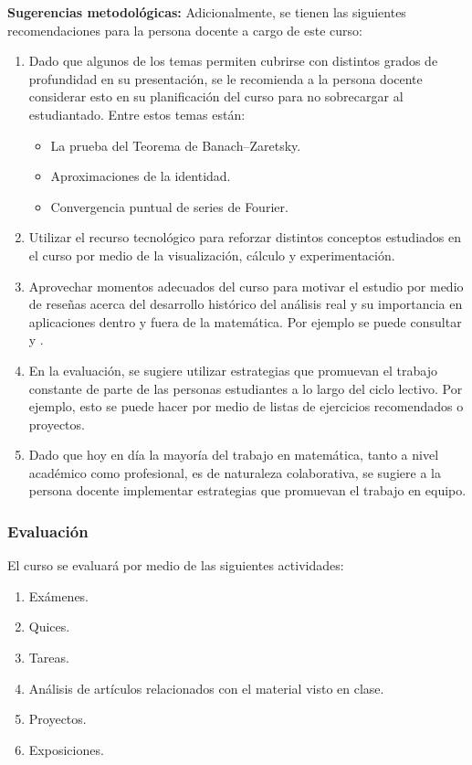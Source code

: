 \begin{refsection}
\textbf{Sugerencias metodológicas:} Adicionalmente, se tienen las siguientes recomendaciones para la persona docente a cargo de este curso:
\begin{enumerate}
    \item Dado que algunos de los temas permiten cubrirse con distintos grados de profundidad en su presentación, se le recomienda a la persona docente considerar esto en su planificación del curso para no sobrecargar al estudiantado. Entre estos temas están: 
    \begin{itemize}
        \item La prueba del Teorema de Banach--Zaretsky.
        \item Aproximaciones de la identidad.
        \item Convergencia puntual de series de Fourier.
    \end{itemize}
    \item Utilizar el recurso tecnológico para reforzar distintos conceptos estudiados en el curso por medio de la visualización, cálculo y experimentación.
    \item Aprovechar momentos adecuados del curso para motivar el estudio por medio de reseñas acerca del desarrollo histórico del análisis real y su importancia en aplicaciones dentro y fuera de la matemática. Por ejemplo se puede consultar \cite{Fol16} y \cite{Bre08}.
    \item En la evaluación, se sugiere utilizar estrategias que promuevan el trabajo constante de parte de las personas estudiantes a lo largo del ciclo lectivo. Por ejemplo, esto se puede hacer por medio de listas de ejercicios recomendados o proyectos.
    \item Dado que hoy en día la mayoría del trabajo en matemática, tanto a nivel académico como profesional, es de naturaleza colaborativa, se sugiere a la persona docente implementar estrategias que promuevan el trabajo en equipo.
\end{enumerate}



\subsubsection*{Evaluación}

El curso se evaluará por medio de las siguientes actividades:

\begin{enumerate}
\item Exámenes.
\item Quices.
\item Tareas.
\item Análisis de artículos relacionados con el material visto en clase.
\item Proyectos.
\item Exposiciones.
\end{enumerate}

\nocite{Lie01}
\nocite{RF10}
\nocite{WZ15}
\nocite{SS05}
\nocite{Hei19}
\nocite{BBT08}
\nocite{Bre08}
\nocite{Fol99}
\nocite{Hei18}
\nocite{Duo01}
\nocite{Kat04}
\nocite{Fol92}
\nocite{SS103}
\nocite{DM72}




\printcursosbibliography
\end{refsection}
